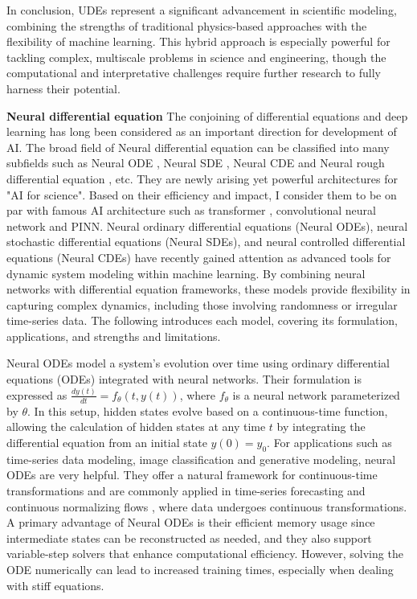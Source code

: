 In conclusion, UDEs represent a significant advancement in scientific modeling, combining the strengths of traditional physics-based approaches with the flexibility of machine learning. This hybrid approach is especially powerful for tackling complex, multiscale problems in science and engineering, though the computational and interpretative challenges require further research to fully harness their potential.

\textbf{Neural differential equation}
The conjoining of differential equations and deep learning has long been considered as an important direction for development of AI. The broad field of Neural differential equation can be classified into many subfields such as Neural ODE \cite{chen2018neural}, Neural SDE \cite{li2020scalable}, Neural CDE \cite{kidger2020neural} and Neural rough differential equation \cite{salimans2022neural}, etc. They are newly arising yet powerful architectures for "AI for science". Based on their efficiency and impact, I consider them to be on par with famous AI architecture such as transformer \cite{vaswani2017attention}, convolutional neural network \cite{lecun1989backpropagation} and PINN. Neural ordinary differential equations (Neural ODEs), neural stochastic differential equations (Neural SDEs), and neural controlled differential equations (Neural CDEs) have recently gained attention as advanced tools for dynamic system modeling within machine learning. By combining neural networks with differential equation frameworks, these models provide flexibility in capturing complex dynamics, including those involving randomness or irregular time-series data. The following introduces each model, covering its formulation, applications, and strengths and limitations.

Neural ODEs model a system's evolution over time using ordinary differential equations (ODEs) integrated with neural networks. Their formulation is expressed as \( \frac{dy(t)}{dt} = f_\theta(t, y(t)) \), where \( f_\theta \) is a neural network parameterized by \(\theta\). In this setup, hidden states evolve based on a continuous-time function, allowing the calculation of hidden states at any time \(t\) by integrating the differential equation from an initial state \(y(0) = y_0\). For applications such as time-series data modeling, image classification and generative modeling, neural ODEs are very helpful. They offer a natural framework for continuous-time transformations and are commonly applied in time-series forecasting and continuous normalizing flows \cite{grathwohl2018ffjord}, where data undergoes continuous transformations. A primary advantage of Neural ODEs is their efficient memory usage since intermediate states can be reconstructed as needed, and they also support variable-step solvers that enhance computational efficiency. However, solving the ODE numerically can lead to increased training times, especially when dealing with stiff equations.

